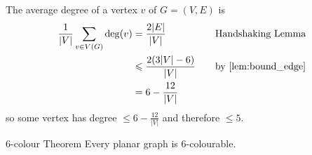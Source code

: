 \begin{Proof}{}{}
    The average degree of a vertex $ v $ of $ G=(V,E) $ is
    \begin{equation*}
        \begin{aligned}
            \frac{1}{|V|} \sum\limits_{v\in V(G)}\deg(v)
             & =\frac{2|E|}{|V|}               & \quad & \text{Handshaking Lemma}          \\
             & \leqslant \frac{2(3|V|-6)}{|V|} & \quad & \text{by~\Cref{lem:bound_edge}} \\
             & =6-\frac{12}{|V|}
        \end{aligned}
    \end{equation*}
    so some vertex has degree $ \leqslant 6-\frac{12}{|V|} $ and therefore
    $ \leqslant 5 $.
\end{Proof}


\begin{Theorem}{6-colour Theorem}{}
    Every planar graph is $ 6 $-colourable.
\end{Theorem}

